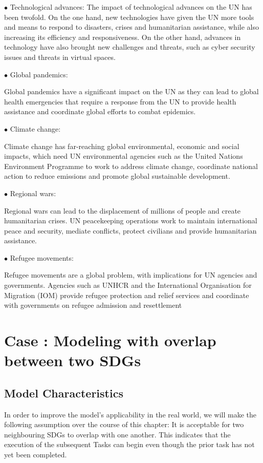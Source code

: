 \documentclass[10pt]{mcmthesis}
\begin{document}
$\bullet$ Technological advances: 
The impact of technological advances on the UN has been twofold. On the one hand, new technologies have given the UN more tools and means to respond to disasters, crises and humanitarian assistance, while also increasing its efficiency and responsiveness. On the other hand, advances in technology have also brought new challenges and threats, such as cyber security issues and threats in virtual spaces.

$\bullet$ Global pandemics: 

Global pandemics have a significant impact on the UN as they can lead to global health emergencies that require a  response from the UN  to provide health assistance and coordinate global efforts to combat epidemics.

$\bullet$ Climate change: 

Climate change has far-reaching global environmental, economic and social impacts, which need UN environmental agencies such as the United Nations Environment Programme to work to address climate change, coordinate national action to reduce emissions and promote global sustainable development.

$\bullet$ Regional wars:

Regional wars can lead to the displacement of millions of people and create humanitarian crises. UN peacekeeping operations work to maintain international peace and security, mediate conflicts, protect civilians and provide humanitarian assistance.

$\bullet$ Refugee movements: 

Refugee movements are a global problem, with implications for UN agencies and governments. Agencies such as UNHCR and the International Organisation for Migration (IOM) provide refugee protection and relief services and coordinate with governments on refugee admission and resettlement





\section{Case \uppercase\expandafter{} : Modeling with overlap between two SDGs }



\subsection{Model Characteristics}%
In order to improve the model's applicability in the real world, we will make the following assumption over the course of this chapter: It is acceptable for two neighbouring SDGs to overlap with one another. This indicates that the execution of the subsequent Tasks can begin even though the prior task has not yet been completed.
\end{document}
